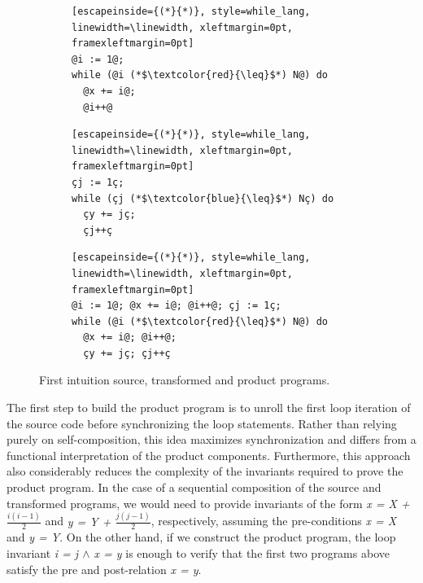 \begin{figure}[h]
  \centering

  \begin{subfigure}[t]{0.28\textwidth}
    \centering
    \par\smallskip
    \noindent
    \begin{lstlisting}[escapeinside={(*}{*)}, style=while_lang, linewidth=\linewidth, xleftmargin=0pt, framexleftmargin=0pt]
@i := 1@; 
while (@i (*$\textcolor{red}{\leq}$*) N@) do
  @x += i@;
  @i++@
    \end{lstlisting}
  \end{subfigure}\hfill%
  \begin{subfigure}[t]{0.28\textwidth}
    \centering
    \par\smallskip
    \noindent
    \begin{lstlisting}[escapeinside={(*}{*)}, style=while_lang, linewidth=\linewidth, xleftmargin=0pt, framexleftmargin=0pt]
çj := 1ç; 
while (çj (*$\textcolor{blue}{\leq}$*) Nç) do
  çy += jç;
  çj++ç
    \end{lstlisting}
  \end{subfigure}\hfill%
  \begin{subfigure}[t]{0.4\textwidth}
    \centering
    \par\smallskip
    \noindent
    \begin{lstlisting}[escapeinside={(*}{*)}, style=while_lang, linewidth=\linewidth, xleftmargin=0pt, framexleftmargin=0pt]
@i := 1@; @x += i@; @i++@; çj := 1ç;
while (@i (*$\textcolor{red}{\leq}$*) N@) do
  @x += i@; @i++@;
  çy += jç; çj++ç
    \end{lstlisting}
  \end{subfigure}

  \caption{First intuition source, transformed and product programs.}
  \label{fig:pp_first_intuition}
\end{figure}

The first step to build the product program is to unroll the first loop iteration of the source code before synchronizing the loop statements.
Rather than relying purely on self-composition, this idea maximizes synchronization and differs from a functional interpretation of the product components.
Furthermore, this approach also considerably reduces the complexity of the invariants required to prove the product program.
In the case of a sequential composition of the source and transformed programs, we would need to provide invariants of the form \emph{x = X + $\frac{i(i-1)}{2}$} and \emph{y = Y + $\frac{j(j-1)}{2}$}, respectively, assuming the pre-conditions \emph{x = X} and \emph{y = Y}.
On the other hand, if we construct the product program, the loop invariant \emph{i = j $\land$ x = y} is enough to verify that the first two programs above satisfy the pre and post-relation \emph{x = y}.


